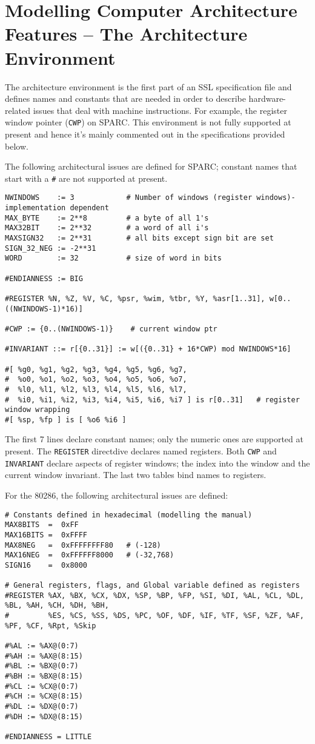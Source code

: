 \section{Modelling Computer Architecture Features -- The Architecture 
	Environment}
\label{sec-archEnv}
The architecture environment is the first part of an SSL 
specification file and defines names and constants that are
needed in order to describe hardware-related issues that 
deal with machine instructions.  For example, the register 
window pointer (\texttt{CWP}) on SPARC.
This environment is not fully supported at present and 
hence it's mainly commented out in the specifications 
provided below.

The following architectural issues are defined for SPARC; constant
names that start with a \texttt{\#} are not supported at present.
{\small
\begin{verbatim}
NWINDOWS    := 3            # Number of windows (register windows)- implementation dependent
MAX_BYTE    := 2**8         # a byte of all 1's
MAX32BIT    := 2**32        # a word of all i's
MAXSIGN32   := 2**31        # all bits except sign bit are set
SIGN_32_NEG := -2**31
WORD        := 32           # size of word in bits
 
#ENDIANNESS := BIG
 
#REGISTER %N, %Z, %V, %C, %psr, %wim, %tbr, %Y, %asr[1..31], w[0..((NWINDOWS-1)*16)]
 
#CWP := {0..(NWINDOWS-1)}    # current window ptr
 
#INVARIANT ::= r[{0..31}] := w[({0..31} + 16*CWP) mod NWINDOWS*16]
 
#[ %g0, %g1, %g2, %g3, %g4, %g5, %g6, %g7,
#  %o0, %o1, %o2, %o3, %o4, %o5, %o6, %o7,
#  %l0, %l1, %l2, %l3, %l4, %l5, %l6, %l7,
#  %i0, %i1, %i2, %i3, %i4, %i5, %i6, %i7 ] is r[0..31]   # register window wrapping
#[ %sp, %fp ] is [ %o6 %i6 ]
\end{verbatim}
}

The first 7 lines declare constant names; only the numeric ones are
supported at present. 
The \texttt{REGISTER} directdive declares named registers.
Both \texttt{CWP} and \texttt{INVARIANT} declare aspects of 
register windows; the index into the window and the current window
invariant.
The last two tables bind names to registers.

For the 80286, the following architectural issues are defined:
{\small
\begin{verbatim}
# Constants defined in hexadecimal (modelling the manual)
MAX8BITS  =  0xFF
MAX16BITS =  0xFFFF
MAX8NEG   =  0xFFFFFFFF80   # (-128)
MAX16NEG  =  0xFFFFFF8000   # (-32,768)
SIGN16    =  0x8000

# General registers, flags, and Global variable defined as registers
#REGISTER %AX, %BX, %CX, %DX, %SP, %BP, %FP, %SI, %DI, %AL, %CL, %DL, %BL, %AH, %CH, %DH, %BH,
#         %ES, %CS, %SS, %DS, %PC, %OF, %DF, %IF, %TF, %SF, %ZF, %AF, %PF, %CF, %Rpt, %Skip

#%AL := %AX@(0:7)
#%AH := %AX@(8:15)
#%BL := %BX@(0:7)
#%BH := %BX@(8:15)
#%CL := %CX@(0:7)
#%CH := %CX@(8:15)
#%DL := %DX@(0:7)
#%DH := %DX@(8:15)

#ENDIANNESS = LITTLE
\end{verbatim}
}

